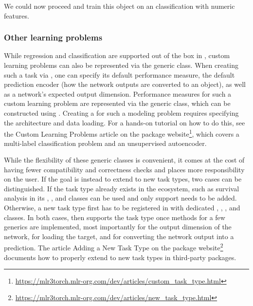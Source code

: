 \documentclass[article,shortnames]{jss}
\theoremstyle{definition}
\begin{document}
We could now proceed and train this object on an \mlrt{} classification  with numeric features.

\subsubsection{Other learning problems}\label{sec:other-task-types}

While regression and classification are supported out of the box in \mlrttorch{}, custom learning problems can also be represented via the generic  class.
When creating such a task via , one can specify its default performance measure, the default prediction encoder (how the network outputs are converted to an  object), as well as a network's expected output dimension.
Performance measures for such a custom learning problem are represented via the generic  class, which can be constructed using .
Creating a  for such a modeling problem requires specifying the architecture and data loading.
For a hands-on tutorial on how to do this, see the Custom Learning Problems article on the package website\footnote{\url{https://mlr3torch.mlr-org.com/dev/articles/custom_task_type.html}}, which covers a multi-label classification problem and an unsupervised autoencoder.

While the flexibility of these generic classes is convenient, it comes at the cost of having fewer compatibility and correctness checks and places more responsibility on the user.
If the goal is instead to extend \mlrttorch{} to new task types, two cases can be distinguished.
If the task type already exists in the \mlrt{} ecosystem, such as survival analysis in  \citep{sonabend2021mlr3proba} its , , and  classes can be used and only \mlrttorch{} support needs to be added.
Otherwise, a new task type first has to be registered in \mlrt{} with dedicated , , , and  classes.
In both cases, \mlrttorch{} then supports the task type once methods for a few generics are implemented, most importantly  for the output dimension of the network,  for loading the target, and  for converting the network output into a prediction.
The article Adding a New Task Type on the package website\footnote{\url{https://mlr3torch.mlr-org.com/dev/articles/new_task_type.html}} documents how to properly extend \mlrttorch{} to new task types in third-party packages.
\end{document}

